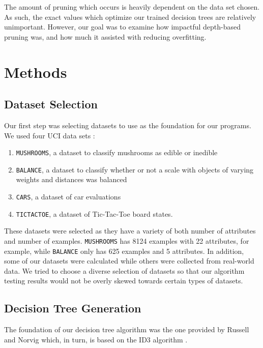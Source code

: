 \documentclass[screen, authorversion, nonacm, sigconf]{acmart}
\begin{document}
The amount of pruning which occurs is heavily dependent on the data set chosen. As such, the exact values which optimize our trained decision trees are relatively unimportant. However, our goal was to examine how impactful depth-based pruning was, and how much it assisted with reducing overfitting.

\section{Methods}

\subsection{Dataset Selection}

Our first step was selecting datasets to use as the foundation for our programs. We used four UCI data sets \cite{Dua:2019}:

\begin{enumerate}
  \item \texttt{MUSHROOMS}, a dataset to classify mushrooms as edible or inedible
  \item \texttt{BALANCE}, a dataset to classify whether or not a scale with objects of varying weights and distances was balanced
  \item \texttt{CARS}, a dataset of car evaluations
  \item \texttt{TICTACTOE}, a dataset of Tic-Tac-Toe board states.
\end{enumerate}

These datasets were selected as they have a variety of both number of attributes and number of examples. \texttt{MUSHROOMS} has 8124 examples with 22 attributes, for example, while \texttt{BALANCE} only has 625 examples and 5 attributes. In addition, some of our datasets were calculated while others were collected from real-world data. We tried to choose a diverse selection of datasets so that our algorithm testing results would not be overly skewed towards certain types of datasets.

\subsection{Decision Tree Generation}

The foundation of our decision tree algorithm was the one provided by Russell and Norvig \cite{russell_norvig_2010} which, in turn, is based on the ID3 algorithm \cite{Quinlan1986}.
\end{document}
